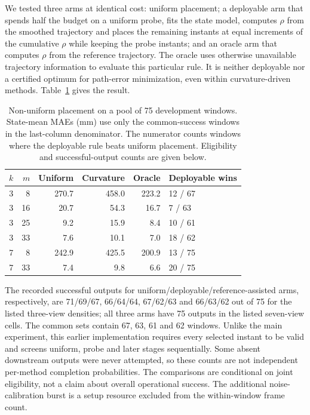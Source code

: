 \documentclass{iopjournal}
\begin{document}
We tested three arms at identical cost: uniform placement; a deployable arm
that spends half the budget on a uniform probe, fits the state model, computes
$\rho$ from the smoothed trajectory and places the remaining instants at equal
increments of the cumulative $\rho$ while keeping the probe instants; and an
oracle arm that computes $\rho$ from the reference trajectory. The oracle uses otherwise unavailable trajectory information to evaluate
this particular rule. It is neither deployable nor a certified optimum for
path-error minimization, even within curvature-driven methods.
Table~\ref{tab:nonuniform} gives the result.

\begin{table}
\caption{Non-uniform placement on a pool of 75 development windows.
State-mean MAEs (mm) use only the common-success windows in the last-column
denominator. The numerator counts windows where the deployable rule beats
uniform placement. Eligibility and successful-output counts are given below.}
\centering
\begin{tabular}{rrrrrl}
\hline
$k$ & $m$ & Uniform & Curvature & Oracle & Deployable wins\\
\hline
3 & 8  & 270.7 & 458.0 & 223.2 & 12 / 67\\
3 & 16 & 20.7  & 54.3  & 16.7  & 7 / 63\\
3 & 25 & 9.2   & 15.9  & 8.4   & 10 / 61\\
3 & 33 & 7.6   & 10.1  & 7.0   & 18 / 62\\
7 & 8  & 242.9 & 425.5 & 200.9 & 13 / 75\\
7 & 33 & 7.4   & 9.8   & 6.6   & 20 / 75\\
\hline
\end{tabular}
\label{tab:nonuniform}
\end{table}

The recorded successful outputs for uniform/deployable/reference-assisted
arms, respectively, are 71/69/67, 66/64/64, 67/62/63 and 66/63/62 out of
75 for the listed three-view densities; all three arms have 75 outputs in
the listed seven-view cells. The common sets contain 67, 63, 61 and 62 windows.
Unlike the main experiment, this earlier implementation requires every
selected instant to be valid and screens uniform, probe and later stages
sequentially. Some absent downstream outputs were never attempted, so these
counts are not independent per-method completion probabilities. The comparisons
are conditional on joint eligibility, not a claim about overall operational
success. The additional noise-calibration burst is a setup resource excluded
from the within-window frame count.
\end{document}
